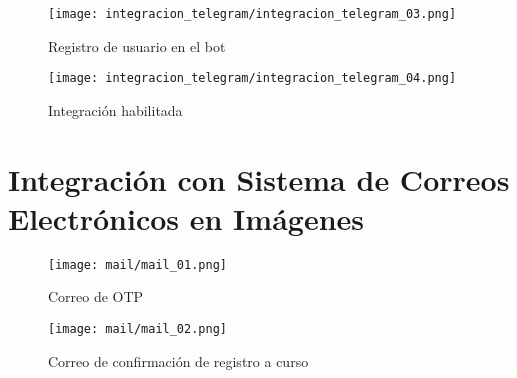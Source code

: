 \begin{figure}[H]
    \centering
    \texttt{[image: integracion\_telegram/integracion\_telegram\_03.png]}
    \caption{Registro de usuario en el bot}
    \label{fig:integracion_telegram_registro_bot}
\end{figure}

\begin{figure}[H]
    \centering
    \texttt{[image: integracion\_telegram/integracion\_telegram\_04.png]}
    \caption{Integración habilitada}
    \label{fig:integracion_telegram_habilitada}
\end{figure}

\section{Integración con Sistema de Correos Electrónicos en Imágenes}

\begin{figure}[H]
    \centering
    \texttt{[image: mail/mail\_01.png]}
    \caption{Correo de OTP}
    \label{fig:correo_electronico_otp}
\end{figure}
\begin{figure}[H]
    \centering
    \texttt{[image: mail/mail\_02.png]}
    \caption{Correo de confirmación de registro a curso}
    \label{fig:correo_electronico_confirmacion_registro_curso}
\end{figure}
